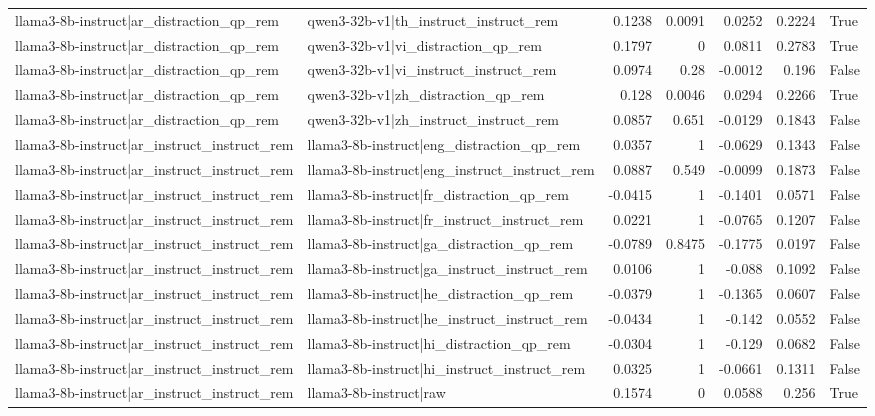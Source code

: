 \begin{table}
\begin{tabular}{l l r r r r l}
llama3-8b-instruct|ar_distraction_qp_rem & qwen3-32b-v1|th_instruct_instruct_rem & 0.1238 & 0.0091 & 0.0252 & 0.2224 & True \\
llama3-8b-instruct|ar_distraction_qp_rem & qwen3-32b-v1|vi_distraction_qp_rem & 0.1797 & 0 & 0.0811 & 0.2783 & True \\
llama3-8b-instruct|ar_distraction_qp_rem & qwen3-32b-v1|vi_instruct_instruct_rem & 0.0974 & 0.28 & -0.0012 & 0.196 & False \\
llama3-8b-instruct|ar_distraction_qp_rem & qwen3-32b-v1|zh_distraction_qp_rem & 0.128 & 0.0046 & 0.0294 & 0.2266 & True \\
llama3-8b-instruct|ar_distraction_qp_rem & qwen3-32b-v1|zh_instruct_instruct_rem & 0.0857 & 0.651 & -0.0129 & 0.1843 & False \\
llama3-8b-instruct|ar_instruct_instruct_rem & llama3-8b-instruct|eng_distraction_qp_rem & 0.0357 & 1 & -0.0629 & 0.1343 & False \\
llama3-8b-instruct|ar_instruct_instruct_rem & llama3-8b-instruct|eng_instruct_instruct_rem & 0.0887 & 0.549 & -0.0099 & 0.1873 & False \\
llama3-8b-instruct|ar_instruct_instruct_rem & llama3-8b-instruct|fr_distraction_qp_rem & -0.0415 & 1 & -0.1401 & 0.0571 & False \\
llama3-8b-instruct|ar_instruct_instruct_rem & llama3-8b-instruct|fr_instruct_instruct_rem & 0.0221 & 1 & -0.0765 & 0.1207 & False \\
llama3-8b-instruct|ar_instruct_instruct_rem & llama3-8b-instruct|ga_distraction_qp_rem & -0.0789 & 0.8475 & -0.1775 & 0.0197 & False \\
llama3-8b-instruct|ar_instruct_instruct_rem & llama3-8b-instruct|ga_instruct_instruct_rem & 0.0106 & 1 & -0.088 & 0.1092 & False \\
llama3-8b-instruct|ar_instruct_instruct_rem & llama3-8b-instruct|he_distraction_qp_rem & -0.0379 & 1 & -0.1365 & 0.0607 & False \\
llama3-8b-instruct|ar_instruct_instruct_rem & llama3-8b-instruct|he_instruct_instruct_rem & -0.0434 & 1 & -0.142 & 0.0552 & False \\
llama3-8b-instruct|ar_instruct_instruct_rem & llama3-8b-instruct|hi_distraction_qp_rem & -0.0304 & 1 & -0.129 & 0.0682 & False \\
llama3-8b-instruct|ar_instruct_instruct_rem & llama3-8b-instruct|hi_instruct_instruct_rem & 0.0325 & 1 & -0.0661 & 0.1311 & False \\
llama3-8b-instruct|ar_instruct_instruct_rem & llama3-8b-instruct|raw & 0.1574 & 0 & 0.0588 & 0.256 & True \\

\end{tabular}
\end{table}
